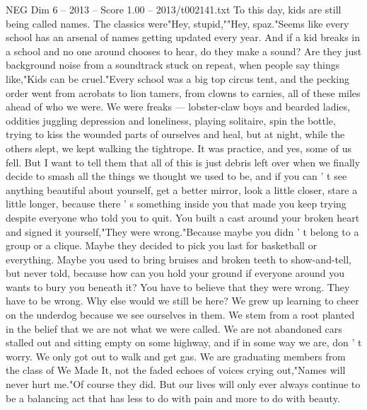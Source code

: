 \begin{textsample}{NEG Dim 6 – 2013 – Score 1.00 – 2013/t002141.txt}
To this day, kids are still being called names.
The classics were"Hey, stupid,""Hey, spaz."Seems like every school has an arsenal of names getting updated every year.
And if a kid breaks in a school and no one around chooses to hear, do they make a sound?
Are they just background noise from a soundtrack stuck on repeat, when people say things like,"Kids can be cruel."Every school was a big top circus tent, and the pecking order went from acrobats to lion tamers, from clowns to carnies, all of these miles ahead of who we were.
We were freaks — lobster-claw boys and bearded ladies, oddities juggling depression and loneliness, playing solitaire, spin the bottle, trying to kiss the wounded parts of ourselves and heal, but at night, while the others slept, we kept walking the tightrope.
It was practice, and yes, some of us fell.
But I want to tell them that all of this is just debris left over when we finally decide to smash all the things we thought we used to be, and if you can ' t see anything beautiful about yourself, get a better mirror, look a little closer, stare a little longer, because there ' s something inside you that made you keep trying despite everyone who told you to quit.
You built a cast around your broken heart and signed it yourself,"They were wrong."Because maybe you didn ' t belong to a group or a clique.
Maybe they decided to pick you last for basketball or everything.
Maybe you used to bring bruises and broken teeth to show-and-tell, but never told, because how can you hold your ground if everyone around you wants to bury you beneath it?
You have to believe that they were wrong.
They have to be wrong.
Why else would we still be here?
We grew up learning to cheer on the underdog because we see ourselves in them.
We stem from a root planted in the belief that we are not what we were called.
We are not abandoned cars stalled out and sitting empty on some highway, and if in some way we are, don ' t worry.
We only got out to walk and get gas.
We are graduating members from the class of We Made It, not the faded echoes of voices crying out,"Names will never hurt me."Of course they did.
But our lives will only ever always continue to be a balancing act that has less to do with pain and more to do with beauty.

\end{textsample}
